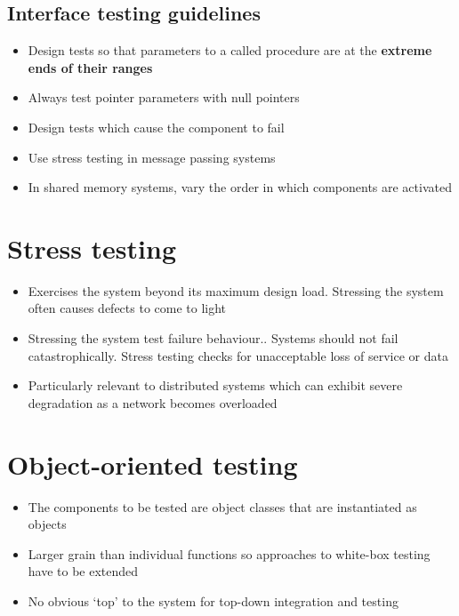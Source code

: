 \documentclass{article}
\begin{document}
\subsection{Interface testing guidelines}

\begin{itemize}
  \item Design tests so that parameters to a called procedure are at the \textbf{extreme ends of their ranges} 
  \item Always test pointer parameters with null pointers 
  \item Design tests which cause the component to fail 
  \item Use stress testing in message passing systems 
  \item In shared memory systems, vary the order in which components are activated
\end{itemize}

\section{Stress testing}

\begin{itemize}
  \item Exercises the system beyond its maximum design load. Stressing the system often causes defects to come to light 
  \item Stressing the system test failure behaviour.. Systems should not fail catastrophically. Stress testing checks for unacceptable loss of service or data 
  \item Particularly relevant to distributed systems which can exhibit severe degradation as a network becomes overloaded
\end{itemize}

\section{Object-oriented testing}

\begin{itemize}
  \item The components to be tested are object classes that are instantiated as objects 
  \item Larger grain than individual functions so approaches to white-box testing have to be extended 
  \item No obvious ‘top’ to the system for top-down integration and testing
\end{itemize}
\end{document}
